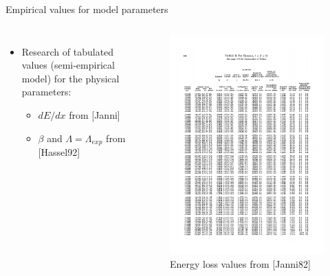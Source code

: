 \documentclass[aspectratio=169,xcolor=dvipsnames,8pt]{beamer}
\begin{document}

 \begin{frame}{Empirical values for model parameters}
     \begin{columns}[c] %

	\begin{itemize}


		\item{Research of tabulated values (semi-empirical model) for the physical parameters:\\
			\begin{itemize}
		
				\item{$dE/dx$ from [Janni]}
				\item{$\beta$ and $\Lambda = \Lambda_{exp}$ from [Hassel92]}
				\end{itemize}}
				
						
	\end{itemize}

		\begin{figure}[h!]
		\includegraphics[width=0.7 \textwidth]{Al-table.pdf}
		\caption{\label{img1} Energy loss values from [Janni82]}
		\end{figure}
     \end{columns}
\end{frame}
\end{document}
